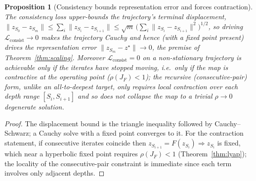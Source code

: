 \documentclass[11pt]{article}
\newtheorem{proposition}[theorem]{Proposition}
\newcommand{\rhoF}{\rho(J_F)}
\begin{document}
\begin{proposition}[Consistency bounds representation error and forces contraction]
\label{prop:consist}
The consistency loss upper-bounds the trajectory's terminal displacement,
$\|z_{S_0}-z_{S_m}\| \le \sum_{i} \|z_{S_i}-z_{S_{i+1}}\| \le \sqrt{m}\,\bigl(\sum_i\|z_{S_i}-z_{S_{i+1}}\|^2\bigr)^{1/2}$,
so driving $\mathcal L_{\mathrm{consist}}\to0$ makes the trajectory Cauchy and hence (with a
fixed point present) drives the representation error $\|z_{S_m}-z^\star\|\to0$, the premise of
Theorem~\ref{thm:scaling}.  Moreover $\mathcal L_{\mathrm{consist}}=0$ on a non-stationary
trajectory is achievable only if the iterates have stopped moving, i.e.\ only if the map is
contractive at the operating point ($\rhoF<1$); the recursive (consecutive-pair) form, unlike
an all-to-deepest target, only requires \emph{local} contraction over each depth range
$[S_i,S_{i+1}]$ and so does not collapse the map to a trivial $\rho\to0$ degenerate solution.
\end{proposition}

\begin{proof}
The displacement bound is the triangle inequality followed by Cauchy--Schwarz; a Cauchy solve
with a fixed point converges to it.  For the contraction statement, if consecutive iterates
coincide then $z_{S_{i+1}}=F(z_{S_i})\Rightarrow z_{S_i}$ is fixed, which near a hyperbolic
fixed point requires $\rhoF<1$ (Theorem~\ref{thm:lyap}); the locality of the consecutive-pair
constraint is immediate since each term involves only adjacent depths.
\end{proof}
\end{document}
